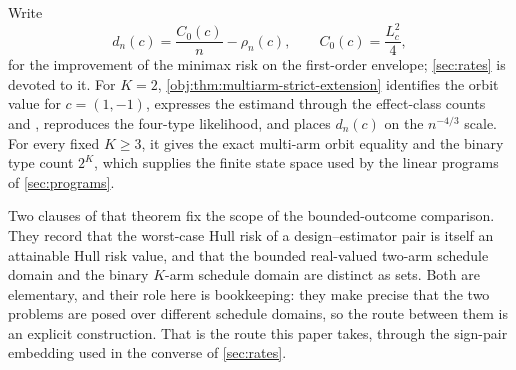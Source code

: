 Write
\[
d_n(c)=\frac{C_0(c)}{n}-\rho_n(c),
\qquad
C_0(c)=\frac{L_c^2}{4},
\]
for the improvement of the minimax risk on the first-order envelope; \cref{sec:rates} is devoted to it. For \(K=2\), \cref{obj:thm:multiarm-strict-extension} identifies the orbit value for \(c=(1,-1)\), expresses the estimand through the effect-class counts  and , reproduces the four-type likelihood, and places \(d_n(c)\) on the \(n^{-4/3}\) scale. For every fixed \(K\ge3\), it gives the exact multi-arm orbit equality and the binary type count \(2^K\), which supplies the finite state space used by the linear programs of \cref{sec:programs}.

Two clauses of that theorem fix the scope of the bounded-outcome comparison. They record that the worst-case Hull risk of a design--estimator pair is itself an attainable Hull risk value, and that the bounded real-valued two-arm schedule domain and the binary \(K\)-arm schedule domain are distinct as sets. Both are elementary, and their role here is bookkeeping: they make precise that the two problems are posed over different schedule domains, so the route between them is an explicit construction. That is the route this paper takes, through the sign-pair embedding used in the converse of \cref{sec:rates}.
